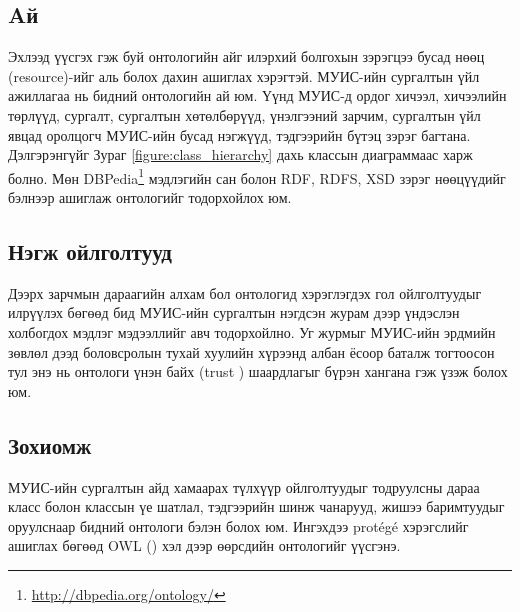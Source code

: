 \documentclass[conference, a4paper, mongolian]{myIEEEtran}
\begin{document}
\subsection{Aй}
%
Эхлээд үүсгэх гэж буй онтологийн айг илэрхий болгохын зэрэгцээ бусад нөөц (resource)-ийг аль болох дахин ашиглах хэрэгтэй. МУИС-ийн сургалтын үйл ажиллагаа нь бидний онтологийн ай юм. Үүнд МУИС-д ордог хичээл, хичээлийн төрлүүд, сургалт, сургалтын хөтөлбөрүүд, үнэлгээний зарчим, сургалтын үйл явцад оролцогч МУИС-ийн бусад нэгжүүд, тэдгээрийн бүтэц зэрэг багтана. Дэлгэрэнгүйг Зураг \ref{figure:class_hierarchy} дахь классын диаграммаас харж болно. 
Мөн DBPedia\footnote{\url{http://dbpedia.org/ontology/}} мэдлэгийн сан болон RDF, RDFS, XSD зэрэг нөөцүүдийг бэлнээр ашиглаж онтологийг тодорхойлох юм.
%
\subsection{Нэгж ойлголтууд}
%
Дээрх зарчмын дараагийн алхам бол онтологид хэрэглэгдэх гол ойлголтуудыг илрүүлэх бөгөөд бид МУИС-ийн сургалтын нэгдсэн журам \cite{bib:8} дээр үндэслэн холбогдох мэдлэг мэдээллийг авч тодорхойлно. Уг журмыг МУИС-ийн эрдмийн зөвлөл дээд боловсролын тухай хуулийн хүрээнд албан ёсоор баталж тогтоосон тул энэ нь онтологи үнэн байх (trust \cite{bib:9}) шаардлагыг бүрэн хангана гэж үзэж болох юм.
%
\subsection{Зохиомж}
%
МУИС-ийн сургалтын айд хамаарах түлхүүр ойлголтуудыг тодруулсны дараа класс болон классын үе шатлал, 
тэдгээрийн шинж чанарууд, жишээ баримтуудыг оруулснаар бидний онтологи бэлэн болох юм. Ингэхдээ prot\'eg\'e хэрэгслийг ашиглах бөгөөд OWL (\cite{bib:10}) хэл дээр өөрсдийн онтологийг үүсгэнэ.
\end{document}
